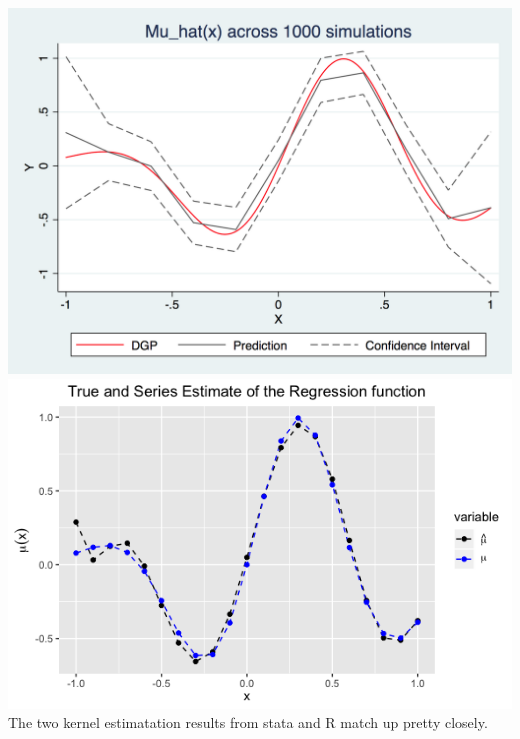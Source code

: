 \documentclass[12pt]{article}
\begin{document}
\subsubsection{}
\includegraphics[totalheight=4cm]{pset2q2c.png}
\includegraphics[totalheight=4cm]{pset2q2c11_r.png}\\
The two kernel estimatation results from stata and R match up pretty closely.
\end{document}
